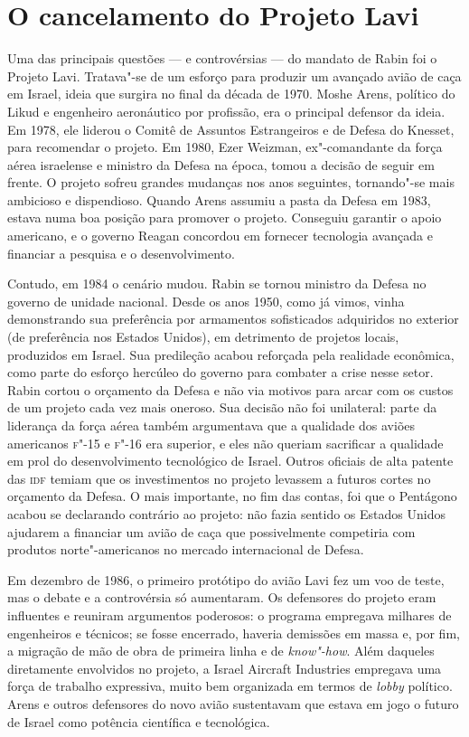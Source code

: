 \section{O cancelamento do Projeto Lavi}

Uma das principais questões --- e controvérsias --- do mandato de Rabin
foi o Projeto Lavi. Tratava"-se de um esforço para produzir um avançado
avião de caça em Israel, ideia que surgira no final da década de 1970.
Moshe Arens, político do Likud e engenheiro aeronáutico por profissão,
era o principal defensor da ideia. Em 1978, ele liderou o Comitê de
Assuntos Estrangeiros e de Defesa do Knesset, para recomendar o projeto.
Em 1980, Ezer Weizman, ex"-comandante da força aérea israelense e
ministro da Defesa na época, tomou a decisão de seguir em frente. O
projeto sofreu grandes mudanças nos anos seguintes, tornando"-se mais
ambicioso e dispendioso. Quando Arens assumiu a pasta da Defesa em 1983,
estava numa boa posição para promover o projeto. Conseguiu garantir o
apoio americano, e o governo Reagan concordou em fornecer tecnologia
avançada e financiar a pesquisa e o desenvolvimento.

Contudo, em 1984 o cenário mudou. Rabin se tornou ministro da Defesa no
governo de unidade nacional. Desde os anos 1950, como já vimos, vinha
demonstrando sua preferência por armamentos sofisticados adquiridos no
exterior (de preferência nos Estados Unidos), em detrimento de projetos
locais, produzidos em Israel. Sua predileção acabou reforçada pela
realidade econômica, como parte do esforço hercúleo do governo para
combater a crise nesse setor. Rabin cortou o orçamento da Defesa e não
via motivos para arcar com os custos de um projeto cada vez mais
oneroso. Sua decisão não foi unilateral: parte da liderança da força
aérea também argumentava que a qualidade dos aviões americanos \textsc{f}"-15 e
\textsc{f}"-16 era superior, e eles não queriam sacrificar a qualidade em prol do
desenvolvimento tecnológico de Israel. Outros oficiais de alta patente
das \textsc{idf} temiam que os investimentos no projeto levassem a futuros cortes
no orçamento da Defesa. O mais importante, no fim das contas, foi que o
Pentágono acabou se declarando contrário ao projeto: não fazia sentido
os Estados Unidos ajudarem a financiar um avião de caça que
possivelmente competiria com produtos norte"-americanos no mercado
internacional de Defesa.

Em dezembro de 1986, o primeiro protótipo do avião Lavi fez um voo de
teste, mas o debate e a controvérsia só aumentaram. Os defensores do
projeto eram influentes e reuniram argumentos poderosos: o programa
empregava milhares de engenheiros e técnicos; se fosse encerrado,
haveria demissões em massa e, por fim, a migração de mão de obra de
primeira linha e de \textit{know"-how}. Além daqueles diretamente envolvidos no
projeto, a Israel Aircraft Industries empregava uma força de trabalho
expressiva, muito bem organizada em termos de \textit{lobby} político. Arens e
outros defensores do novo avião sustentavam que estava em jogo o futuro
de Israel como potência científica e tecnológica.

